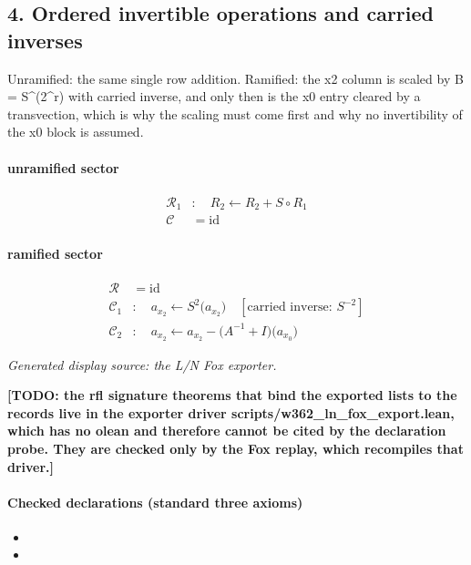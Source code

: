 \subsection*{4. Ordered invertible operations and carried inverses}
Unramified: the same single row addition. Ramified: the x2 column is scaled by B = S\textasciicircum{}(2\textasciicircum{}r) with carried inverse, and only then is the x0 entry cleared by a transvection, which is why the scaling must come first and why no invertibility of the x0 block is assumed.

\paragraph{unramified sector}
\[\begin{aligned}\mathcal R_{1}&:\quad R_2\leftarrow R_2+S\circ R_1\\\mathcal C&=\mathrm{id}\end{aligned}\]
\paragraph{ramified sector}
\[\begin{aligned}\mathcal R&=\mathrm{id}\\\mathcal C_{1}&:\quad a_{x_{2}}\leftarrow S^{2}\bigl(a_{x_{2}}\bigr)\quad[\text{carried inverse: }S^{-2}]\\\mathcal C_{2}&:\quad a_{x_{2}}\leftarrow a_{x_{2}}-\bigl(A^{-1}+I\bigr)\bigl(a_{x_{0}}\bigr)\end{aligned}\]
\par\noindent\emph{Generated display source: the L/N Fox exporter.}
\par\noindent\textbf{[TODO: the rfl signature theorems that bind the exported lists to the records live in the exporter driver scripts/w362\_ln\_fox\_export.lean, which has no olean and therefore cannot be cited by the declaration probe. They are checked only by the Fox replay, which recompiles that driver.]}
\paragraph{Checked declarations (standard three axioms)}
\begin{itemize}
\item {}
\item {}
\end{itemize}

